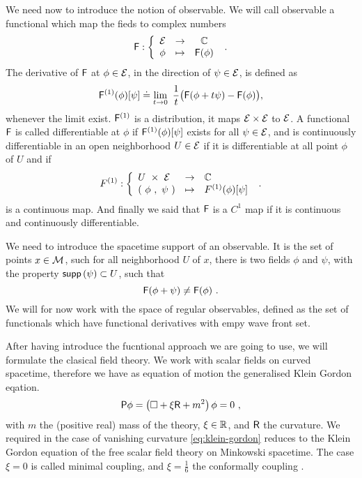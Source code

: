 We need now to introduce the notion of observable. We will call observable a functional which map the fieds to complex numbers%
%
\begin{equation*}
\mathsf{F} : \left\{
\begin{array}{ccc}
\mathcal{E} & \to     & \mathbb{C} \\
\phi  & \mapsto & \mathsf{F}(\phi)
\end{array}
\right. \ .
\end{equation*}
%
The derivative of $\mathsf{F}$ at $\phi \in \mathcal{E}$, in the direction of $\psi \in \mathcal{E}$, is defined as%
%
\begin{equation*}
\Fsf^{(1)}(\phi)[\psi] \doteq \lim_{t \to 0} \ \frac{1}{t} \big( \Fsf(\phi + t \psi) - \Fsf(\phi) \big),
\end{equation*}
%
whenever the limit exist. $\mathsf{F}^{(1)}$ is a distribution, it maps $\mathcal{E}\times\mathcal{E}$ to $\mathcal{E}$. A functional $\mathsf{F}$ is called differentiable at $\phi$ if $\mathsf{F}^{(1)}(\phi)[\psi]$ exists for all $\psi \in \mathcal{E}$, and is continuously differentiable in an open neighborhood $U \in \mathcal{E}$ if it is differentiable at all point $\phi$ of $U$ and if%
%
\begin{equation*}
F^{(1)} : 
\left\{ 
\begin{array}{lcl}
U \ \times \ \mathcal{E} & \to & \mathbb{C} \\ 
( \ \phi \ , \ \psi \ ) & \mapsto & F^{(1)}(\phi)[\psi]
\end{array}
\right. \ .
\end{equation*}
%
is a continuous map. And finally we said that $\mathsf{F}$ is a $C^{1}$ map if it is continuous and continuously differentiable.\par%


We need to introduce the spacetime support of an observable. It is the set of points $x \in \mathcal{M}$, such for all neighborhood $U$ of $x$, there is two fields $\phi$ and $\psi$, with the property $\mathsf{supp}\left(\psi\right) \subset U$, such that%
%
\begin{equation*}
\mathsf{F}(\phi+\psi) \neq \mathsf{F}(\phi) \ . 
\end{equation*}
%
We will for now work with the space of regular observables, defined as the set of functionals which have functional derivatives with empy wave front set.\par%


After having introduce the fucntional approach we are going to use, we will formulate the clasical field theory. We work with scalar fields on curved spacetime, therefore we have as equation of motion the generalised Klein Gordon eqation.%
%
\begin{equation}
\mathsf{P} \phi = \left( \Box + \xi \mathsf{R} + m^2 \right) \phi = 0 \ , 
\label{eq:klein-gordon}
\end{equation}
%
with $m$ the (positive real) mass of the theory, $\xi \in \mathbb{R}$, and $\mathsf{R}$ the curvature. We required in the case of vanishing curvature \eqref{eq:klein-gordon} reduces to the Klein Gordon equation of the free scalar field theory on Minkowski spacetime. The case $\xi=0$ is called minimal coupling, and $\xi=\frac16$ the conformally coupling \cite[Appendix D]{waldGR}.\par%


